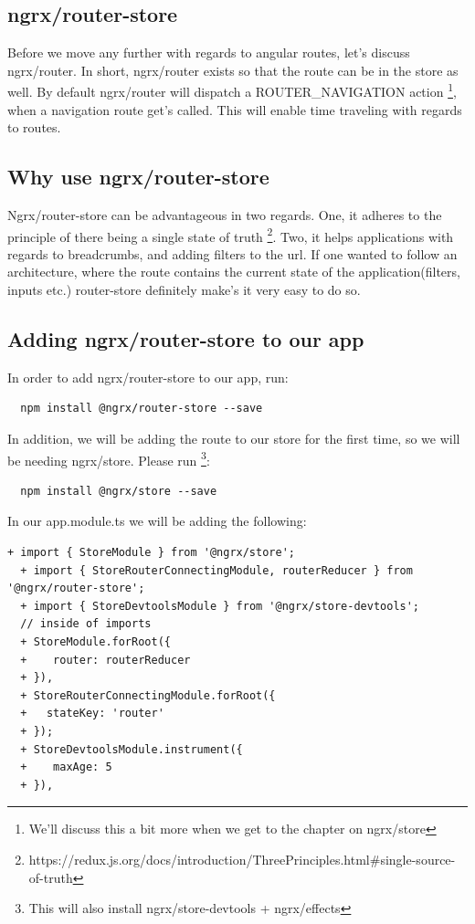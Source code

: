 \subsection{ ngrx/router-store }

Before we move any further with regards to angular routes, let's discuss
ngrx/router. In short, ngrx/router exists so that the route can be in the store
as well. By default ngrx/router will dispatch a ROUTER\_NAVIGATION action
\footnote{We'll discuss this a bit more when we get to the chapter on ngrx/store},
when a navigation route get's called. This will enable time traveling with
regards to routes.

\subsection{ Why use ngrx/router-store }

Ngrx/router-store can be advantageous in two regards. One, it adheres to the
principle of there being a single state of truth \footnote{https://redux.js.org/docs/introduction/ThreePrinciples.html\#single-source-of-truth}.
Two, it helps applications with regards to breadcrumbs, and adding filters to the
url. If one wanted to follow an architecture, where the route contains the current
state of the application(filters, inputs etc.) router-store definitely make's it
very easy to do so.

\subsection{ Adding ngrx/router-store to our app }

In order to add ngrx/router-store to our app, run:
\begin{verbatim}
  npm install @ngrx/router-store --save
\end{verbatim}

In addition, we will be adding the route to our store for the first time, so we
will be needing ngrx/store. Please run \footnote{This will also install ngrx/store-devtools + ngrx/effects}:
\begin{verbatim}
  npm install @ngrx/store --save
\end{verbatim}

In our app.module.ts we will be adding the following:
\begin{lstlisting}[caption=My Javascript Example]
  + import { StoreModule } from '@ngrx/store';
  + import { StoreRouterConnectingModule, routerReducer } from '@ngrx/router-store';
  + import { StoreDevtoolsModule } from '@ngrx/store-devtools';
  // inside of imports
  + StoreModule.forRoot({
  +    router: routerReducer
  + }),
  + StoreRouterConnectingModule.forRoot({
  +   stateKey: 'router'
  + });
  + StoreDevtoolsModule.instrument({
  +    maxAge: 5
  + }),
\end{lstlisting}

